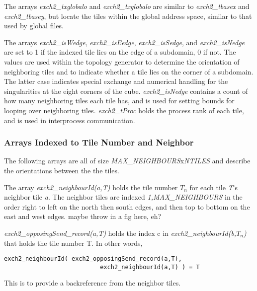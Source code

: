 The arrays {\em exch2\_txglobalo} and {\em exch2\_txglobalo} are similar to
{\em exch2\_tbasex} and {\em exch2\_tbasey}, but locate the tiles within
the global address space, similar to that used by global files.  

The arrays {\em exch2\_isWedge}, {\em exch2\_isEedge}, {\em exch2\_isSedge}, 
and {\em exch2\_isNedge} are set to 1 if the indexed tile lies on the edge
of a subdomain, 0 if not.  The values are used within the topology generator
to determine the orientation of neighboring tiles and to indicate whether 
a tile lies on the corner of a subdomain.  The latter case indicates 
special exchange and numerical handling for the singularities at the eight 
corners of the cube.  {\em exch2\_isNedge} contains a count of how many
neighboring tiles each tile has, and is used for setting bounds for looping
over neighboring tiles.  {\em exch2\_tProc} holds the process rank of each tile,
and is used in interprocess communication.

\subsubsection{Arrays Indexed to Tile Number and Neighbor}

The following arrays are all of size {\em MAX\_NEIGHBOURS}x{\em NTILES} and
describe the orientations between the the tiles.

The array {\em exch2\_neighbourId(a,T)} holds the tile number $T_{n}$ for each tile 
{\em T}'s neighbor tile {\em a}.  The neighbor tiles are indexed {\em 1,MAX\_NEIGHBOURS }
in the order right to left on the north then south edges, and then top to bottom on the east 
and west edges. maybe throw in a fig here, eh?  

{\em exch2\_opposingSend\_record(a,T)} holds 
the index c in {\em exch2\_neighbourId(b,$T_{n}$)} that holds the tile number T.
In other words,

\begin{verbatim}   
exch2_neighbourId( exch2_opposingSend_record(a,T), 
                           exch2_neighbourId(a,T) ) = T
\end{verbatim}


This is to provide a backreference from the neighbor tiles.

